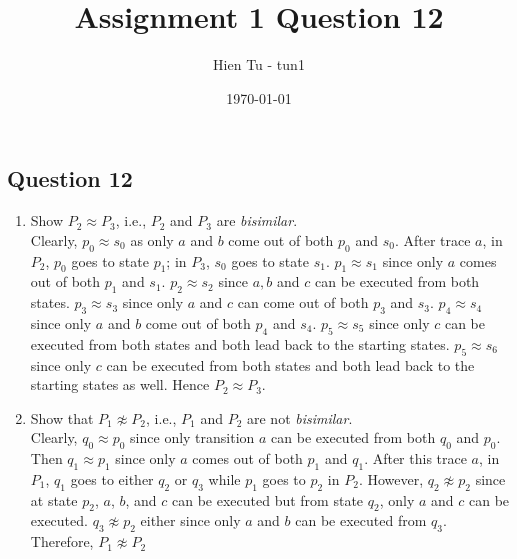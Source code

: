 \documentclass{article}
\title{Assignment 1 Question 12}
\author{Hien Tu - tun1}
\date{\today}
\begin{document}
\maketitle

\subsection*{Question 12}
\begin{enumerate}[label=\alph*.]
    \item Show $P_2 \approx P_3$, i.e., $P_2$ and $P_3$ are \emph{bisimilar}. \\

        Clearly, $p_0 \approx s_0$ as only $a$ and $b$ come out of both $p_0$ and
        $s_0$. After trace $a$, in $P_2$, $p_0$ goes to state $p_1$; in $P_3$, 
        $s_0$ goes to state $s_1$. $p_1 \approx s_1$ since only $a$ comes out of
        both $p_1$ and $s_1$. $p_2 \approx s_2$ since $a, b$ and $c$ can be
        executed from both states. $p_3 \approx s_3$ since only $a$ and $c$ can
        come out of both $p_3$ and $s_3$. $p_4 \approx s_4$ since only $a$ and
        $b$ come out of both $p_4$ and $s_4$. $p_5 \approx s_5$ since only $c$
        can be executed from both states and both lead back to the starting
        states. $p_5 \approx s_6$ since only $c$ can be executed from both states
        and both lead back to the starting states as well. Hence $P_2 \approx P_3$.
    
    \item Show that $P_1 \not \approx P_2$, i.e., $P_1$ and $P_2$ are not
          \emph{bisimilar}. \\

        Clearly, $q_0 \approx p_0$ since only transition $a$ can be executed from
        both $q_0$ and $p_0$. Then $q_1 \approx p_1$ since only $a$ comes out of
        both $p_1$ and $q_1$. After this trace $a$, in $P_1$, $q_1$ goes to either
        $q_2$ or $q_3$ while $p_1$ goes to $p_2$ in $P_2$. However, $q_2 \not
        \approx p_2$ since at state $p_2$, $a$, $b$, and $c$ can be executed but
        from state $q_2$, only $a$ and $c$ can be executed. $q_3 \not \approx p_2$
        either since only $a$ and $b$ can be executed from $q_3$. Therefore,
        $P_1 \not \approx P_2$ 

\end{enumerate}
\end{document}
